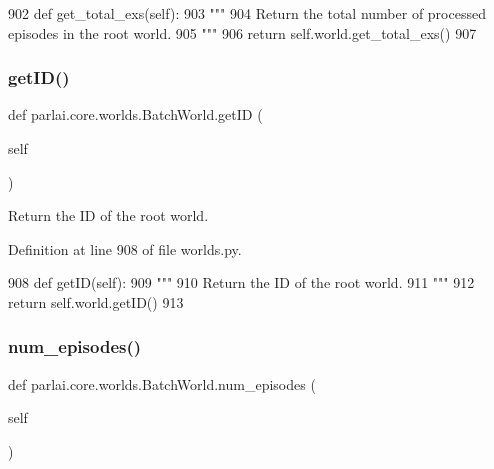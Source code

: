 \begin{DoxyCode}
902     \textcolor{keyword}{def }get\_total\_exs(self):
903         \textcolor{stringliteral}{"""}
904 \textcolor{stringliteral}{        Return the total number of processed episodes in the root world.}
905 \textcolor{stringliteral}{        """}
906         \textcolor{keywordflow}{return} self.world.get\_total\_exs()
907 
\end{DoxyCode}
\mbox{\label{classparlai_1_1core_1_1worlds_1_1BatchWorld_a995d9405ae22301e3ca46c43521b301a}} 
\subsubsection{\texorpdfstring{get\+I\+D()}{getID()}}
{\footnotesize\ttfamily def parlai.\+core.\+worlds.\+Batch\+World.\+get\+ID (\begin{DoxyParamCaption}\item[{}]{self }\end{DoxyParamCaption})}

\begin{DoxyVerb}Return the ID of the root world.
\end{DoxyVerb}
 

Definition at line 908 of file worlds.\+py.


\begin{DoxyCode}
908     \textcolor{keyword}{def }getID(self):
909         \textcolor{stringliteral}{"""}
910 \textcolor{stringliteral}{        Return the ID of the root world.}
911 \textcolor{stringliteral}{        """}
912         \textcolor{keywordflow}{return} self.world.getID()
913 
\end{DoxyCode}
\mbox{\label{classparlai_1_1core_1_1worlds_1_1BatchWorld_ae3f96cd2de72eb0f333cb29bbf74177b}} 
\subsubsection{\texorpdfstring{num\+\_\+episodes()}{num\_episodes()}}
{\footnotesize\ttfamily def parlai.\+core.\+worlds.\+Batch\+World.\+num\+\_\+episodes (\begin{DoxyParamCaption}\item[{}]{self }\end{DoxyParamCaption})}

